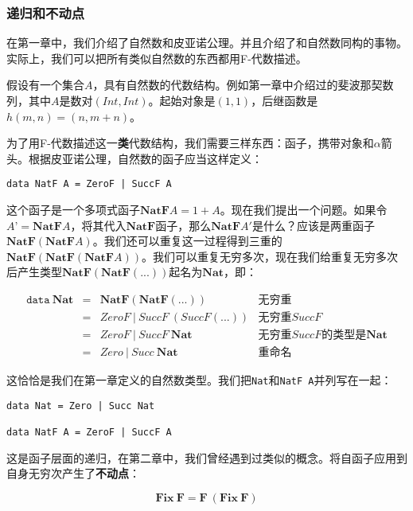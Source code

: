 \documentclass{article}
\begin{document}
\subsubsection{递归和不动点}

在第一章中，我们介绍了自然数和皮亚诺公理。并且介绍了和自然数同构的事物。实际上，我们可以把所有类似自然数的东西都用F-代数描述。

假设有一个集合$A$，具有自然数的代数结构。例如第一章中介绍过的斐波那契数列，其中$A$是数对$(Int, Int)$。起始对象是$(1, 1)$，后继函数是$h(m, n) = (n, m + n)$。

为了用F-代数描述这一\textbf{类}代数结构，我们需要三样东西：函子，携带对象和$\alpha$箭头。根据皮亚诺公理，自然数的函子应当这样定义：

\lstset{frame=none}
\begin{lstlisting}
data NatF A = ZeroF | SuccF A
\end{lstlisting}

这个函子是一个多项式函子$\mathbf{NatF} A = 1 + A$。现在我们提出一个问题。如果令$A’ = \mathbf{NatF} A$，将其代入$\mathbf{NatF}$函子，那么$\mathbf{NatF} A'$是什么？应该是两重函子$\mathbf{NatF}(\mathbf{NatF} A)$。我们还可以重复这一过程得到三重的$\mathbf{NatF}(\mathbf{NatF}(\mathbf{NatF} A))$。我们可以重复无穷多次，现在我们给重复无穷多次后产生类型$\mathbf{NatF}(\mathbf{NatF}(...))$起名为$\mathbf{Nat}$，即：

\[
\begin{array}{rcll}
\texttt{data}\ \mathbf{Nat} & = & \mathbf{NatF}(\mathbf{NatF}(...)) & \text{无穷重} \\
         & = & ZeroF\ |\ SuccF\ (SuccF (...)) & \text{无穷重}SuccF \\
         & = & ZeroF\ |\ SuccF\ \mathbf{Nat} & \text{无穷重}SuccF\text{的类型是}\mathbf{Nat} \\
         & = & Zero\ |\ Succ\ \mathbf{Nat} & \text{重命名}
\end{array}
\]

这恰恰是我们在第一章定义的自然数类型。我们把\texttt{Nat}和\texttt{NatF A}并列写在一起：

\begin{lstlisting}
data Nat = Zero | Succ Nat

data NatF A = ZeroF | SuccF A
\end{lstlisting}

这是函子层面的递归，在第二章中，我们曾经遇到过类似的概念。将自函子应用到自身无穷次产生了\textbf{不动点}：

\[
\mathbf{Fix}\ \mathbf{F} = \mathbf{F}\ (\mathbf{Fix}\ \mathbf{F})
\]
\end{document}

